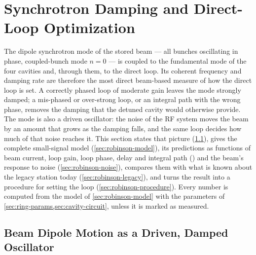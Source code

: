 \section{Synchrotron Damping and Direct-Loop Optimization}\label{sec:robinson}

The dipole synchrotron mode of the stored beam --- all bunches oscillating in phase, coupled-bunch mode \(n = 0\) --- is coupled to the fundamental mode of the four cavities and, through them, to the direct loop. Its coherent frequency and damping rate are therefore the most direct beam-based measure of how the direct loop is set. A correctly phased loop of moderate gain leaves the mode strongly damped; a mis-phased or over-strong loop, or an integral path with the wrong phase, removes the damping that the detuned cavity would otherwise provide. The mode is also a driven oscillator: the noise of the RF system moves the beam by an amount that grows as the damping falls, and the same loop decides how much of that noise reaches it. This section states that picture (\cref{sec:robinson-picture}), gives the complete small-signal model (\cref{sec:robinson-model}), its predictions as functions of beam current, loop gain, loop phase, delay and integral path () and the beam's response to noise (\cref{sec:robinson-noise}), compares them with what is known about the legacy station today (\cref{sec:robinson-legacy}), and turns the result into a procedure for setting the loop (\cref{sec:robinson-procedure}). Every number is computed from the model of \cref{sec:robinson-model} with the parameters of \cref{sec:ring-params,sec:cavity-circuit}, unless it is marked as measured.

\subsection{Beam Dipole Motion as a Driven, Damped Oscillator}\label{sec:robinson-picture}

